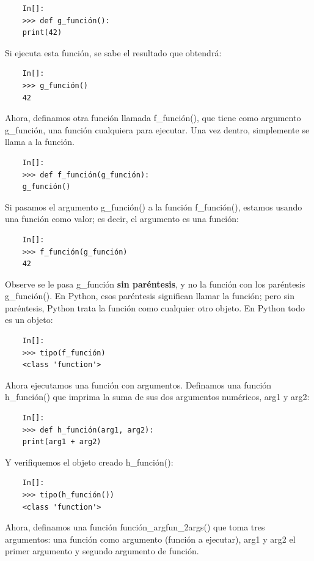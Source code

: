\begin{lstlisting}
	In[]:
	>>> def g_función():
	print(42)
\end{lstlisting}Si ejecuta esta función, se sabe el resultado que obtendrá:

\begin{lstlisting}
	In[]:	
	>>> g_función()
	42
\end{lstlisting}
Ahora, definamos otra función llamada {\ttfamily f\_función()}, que tiene como argumento {\ttfamily g\_función}, 
una función cualquiera para ejecutar. Una vez dentro, simplemente se llama a la función.

\begin{lstlisting}
	In[]:	
	>>> def f_función(g_función):
	g_función()
\end{lstlisting}

Si pasamos el argumento {\ttfamily g\_función()} a la función {\ttfamily f\_función()}, estamos usando una función como valor; es decir, el argumento es una función:

\begin{lstlisting}	
	In[]:
	>>> f_función(g_función)
	42
\end{lstlisting}

Observe se le pasa {\ttfamily g\_función} {\bf  sin paréntesis}, y no la función con los paréntesis {\ttfamily  g\_función()}. En Python, esos paréntesis significan llamar la función; pero sin paréntesis, Python trata la función como cualquier otro objeto. En Python todo es un objeto:

\begin{lstlisting}
	In[]:
	>>> tipo(f_función)
	<class 'function'>
\end{lstlisting}

Ahora ejecutamos una función con argumentos. Definamos una función {\ttfamily h\_función()} que imprima
la suma de sus dos argumentos numéricos, {\ttfamily arg1} y {\ttfamily arg2}:

\begin{lstlisting}
	In[]:
	>>> def h_función(arg1, arg2):
	print(arg1 + arg2)
\end{lstlisting}

Y verifiquemos el objeto creado {\ttfamily h\_función()}:

\begin{lstlisting}
	In[]:
	>>> tipo(h_función())
	<class 'function'>
\end{lstlisting}


Ahora, definamos una función  {\ttfamily función\_argfun\_2args()} que toma tres
argumentos: una función como argumento (función a ejecutar), {\ttfamily arg1} y {\ttfamily arg2} el primer argumento y segundo argumento de función.

